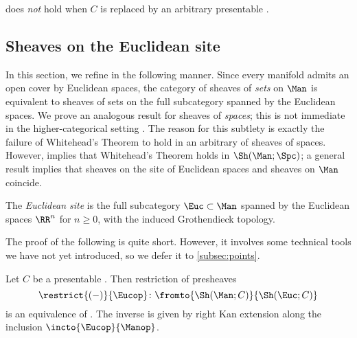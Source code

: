 \begin{warning}
	 does \textit{not} hold when $ C $ is replaced by an arbitrary presentable \category.
\end{warning}


\subsection{Sheaves on the Euclidean site}\label{subsec:Cartsheaves}

In this section, we refine  in the following manner.
Since every manifold admits an open cover by Euclidean spaces, the category of sheaves of \textit{sets} on $ \Man $ is equivalent to sheaves of sets on the full subcategory spanned by the Euclidean spaces.
We prove an analogous result for sheaves of \textit{spaces}; this is not immediate in the higher-categorical setting .
The reason for this subtlety is exactly the failure of Whitehead's Theorem to hold in an arbitrary \category of sheaves of spaces.
However,  implies that Whitehead's Theorem holds in $ \Sh(\Man;\Spc) $; a general result \cite[Corollary 3.12.13]{exodromy} implies that sheaves on the site of Euclidean spaces and sheaves on $ \Man $ coincide.

 
\begin{definition}\label{def:Euclideansite}
	The \textit{Euclidean site} is the full subcategory $ \Euc \subset \Man $ spanned by the Euclidean spaces $ \RR^n $ for $ n \geq 0 $, with the induced Grothendieck topology.
\end{definition}

The proof of the following is quite short. 
However, it involves some technical tools we have not yet introduced, so we defer it to \cref{subsec:points}.

\begin{lemma}\label{lem:hypersheavesonCart}
	Let $ C $ be a presentable \category.
	Then restriction of presheaves
	\begin{equation*}
		\restrict{(-)}{\Eucop} \colon \fromto{\Sh(\Man;C)}{\Sh(\Euc;C)}
	\end{equation*}
	is an equivalence of \categories.
	The inverse is given by right Kan extension along the inclusion $ \incto{\Eucop}{\Manop} $.
\end{lemma}


